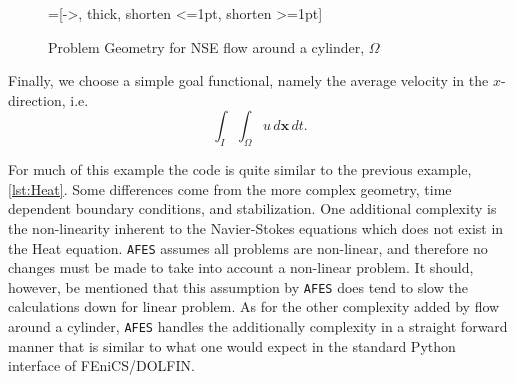     \begin{figure}[h]
        \centering
        =[->, thick, shorten <=1pt, shorten >=1pt]
        \caption{Problem Geometry for NSE flow around a cylinder, $\Omega$}
        \label{fig:2DCylinder}
    \end{figure}

    Finally, we choose a simple goal functional, namely the average velocity in
    the $x$-direction, i.e.
    \begin{equation}
        \int_{I}\!\int_{\Omega} u\, d\mathbf{x}\,dt.
        \label{eq:NSEGoal}
    \end{equation}

    For much of this example the code is quite similar to the previous example,
    \autoref{lst:Heat}.  Some differences come from the more complex geometry,
    time dependent boundary conditions, and stabilization. One additional
    complexity is the non-linearity inherent to the Navier-Stokes equations
    which does not exist in the Heat equation. \texttt{AFES} assumes all problems are
    non-linear, and therefore no changes must be made to take into account a
    non-linear problem.  It should, however, be mentioned that this assumption
    by \texttt{AFES} does tend to slow the calculations down for linear problem. As for
    the other complexity added by flow around a cylinder, \texttt{AFES} handles the
    additionally complexity in a straight forward manner that is similar to what
    one would expect in the standard Python interface of FEniCS/DOLFIN.

